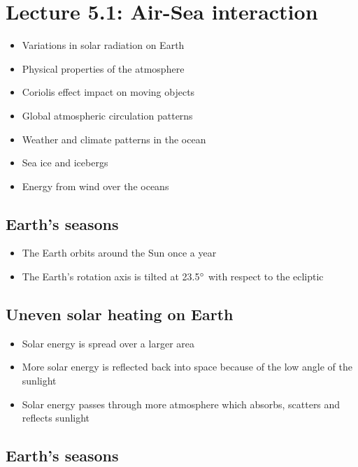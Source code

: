 \section{Lecture 5.1: Air-Sea interaction}

\begin{itemize}
    \item Variations in solar radiation on Earth
    \item Physical properties of the atmosphere
    \item Coriolis effect impact on moving objects
    \item Global atmospheric circulation patterns
    \item Weather and climate patterns in the ocean
    \item Sea ice and icebergs
    \item Energy from wind over the oceans
\end{itemize}

\subsection{Earth's seasons}

\begin{itemize}
    \item The Earth orbits around the Sun once a year
    \item The Earth's rotation axis is tilted at 23.5$\degree$
        with respect to the ecliptic
\end{itemize}

\subsection{Uneven solar heating on Earth}

\begin{itemize}
    \item Solar energy is spread over a larger area
    \item More solar energy is reflected back into space because of the low
        angle of the sunlight
    \item Solar energy passes through more atmosphere which absorbs, scatters
        and reflects sunlight
\end{itemize}

\subsection{Earth's seasons}

